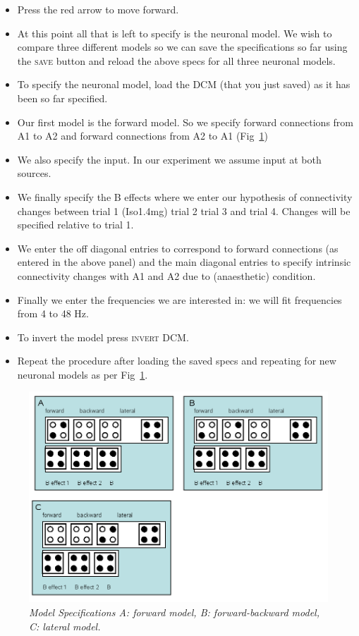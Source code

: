 \begin{itemize}
\item Press the red arrow to move forward.
\item At this point all that is left to specify is the neuronal model. We wish to compare three different models so we can save the specifications so far using the \textsc{save} button and reload the above specs for all three neuronal models.
\item To specify the neuronal model, load the DCM (that you just saved) as it has been so far specified.
\item Our first model is the forward model. So we specify forward connections from A1 to A2 and forward connections from A2 to A1 (Fig~\ref{dcm_ssr:fig2})
\item We also specify the input. In our experiment we assume input at both sources.
\item We finally specify the B effects where we enter our hypothesis of connectivity changes between trial 1 (Iso1.4mg) trial 2 trial 3 and trial 4. Changes will be specified relative to trial 1.
\item We enter the off diagonal entries to correspond to forward connections (as entered in the above panel) and the main diagonal entries to specify intrinsic connectivity changes with A1 and A2 due to (anaesthetic) condition.
\item Finally we enter the frequencies we are interested in: we will fit frequencies from 4 to 48 Hz.
\item To invert the model press \textsc{invert DCM}.
\item Repeat the procedure after loading the saved specs and repeating for new neuronal models as per Fig~\ref{dcm_ssr:fig2}.
\end{itemize}

\begin{figure}
\begin{center}
\includegraphics[width=140mm]{dcm_ssr/fig2}
\caption{\em Model Specifications A: forward model, B: forward-backward model, C: lateral model. \label{dcm_ssr:fig2}}
\end{center}
\end{figure}

